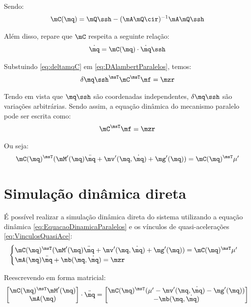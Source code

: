 \documentclass[]{politex}
\begin{document}
Sendo:
\begin{equation} \label{eq:CComplemento}
\mC(\mq) = \mQ\ssh -(\mA \mQ\cir)^{-1} \mA \mQ\ssh 
\end{equation}


Além disso, repare que $\mC$ respeita a seguinte relação:
\begin{equation} \label{eq:CCinematica}
\dot{\mq} = \mC(\mq) \cdot \dot{\mq}\ssh
\end{equation}

Substuindo \eqref{eq:deltamqC} em \eqref{eq:DAlambertParalelos}, temos:
\begin{equation}
\delta {\mq\ssh}^\msT \mC^\msT \mf = \mzr
\end{equation}

Tendo em vista que $\mq\ssh$ são coordenadas independentes, $\delta \mq\ssh$ são variações arbitrárias. Sendo assim, a equação dinâmica do mecanismo paralelo pode ser escrita como:
\begin{equation}
\mC^\msT \mf = \mzr
\end{equation}

Ou seja:
\begin{equation} \label{eq:EquacaoDinamicaParalelos}
\mC(\mq)^\msT (   \mM'(\mq)\ddot{\mq} + \mv'(\mq,\dot{\mq}) + \mg'(\mq) ) = \mC(\mq)^\msT \mu'
\end{equation}

\section{Simulação dinâmica direta} \label{S05-03-04}

É possível realizar a simulação dinâmica direta do sistema utilizando a equação dinâmica \eqref{eq:EquacaoDinamicaParalelos} e os vínculos de quasi-acelerações \eqref{eq:VinculosQuasiAce}:
\begin{equation}
\begin{cases}
\mC(\mq)^\msT (   \mM'(\mq)\ddot{\mq} + \mv'(\mq,\dot{\mq}) + \mg'(\mq) ) = \mC(\mq)^\msT \mu' \\
\mA(\mq)\ddot{\mq} + \mb(\mq,\dot{\mq}) = \mzr
\end{cases}
\end{equation}

Reescrevendo em forma matricial:
\begin{equation}
\begin{bmatrix}
\mC(\mq)^\msT \mM'(\mq) \\
\mA(\mq)
\end{bmatrix}
\cdot
\ddot{\mq}
=
\begin{bmatrix}
\mC(\mq)^\msT (\mu' - \mv'(\mq,\dot{\mq}) - \mg'(\mq) ) \\
-\mb(\mq,\dot{\mq})
\end{bmatrix}
\end{equation}
\end{document}
